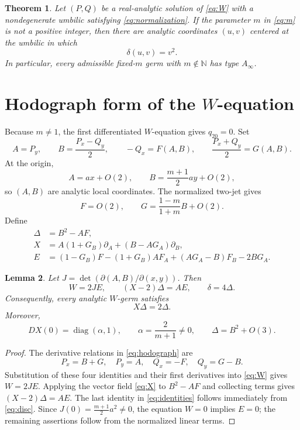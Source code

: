 \documentclass[11pt]{article}
\newtheorem{theorem}{Theorem}
\newtheorem{lemma}[theorem]{Lemma}
\theoremstyle{remark}
\begin{document}
\begin{theorem}\label{thm:main}
Let $(P,Q)$ be a real-analytic solution of \eqref{eq:W} with a
nondegenerate umbilic satisfying \eqref{eq:normalization}.  If the parameter
$m$ in \eqref{eq:m} is not a positive integer, then there are analytic
coordinates $(u,v)$ centered at the umbilic in which
\[
 \delta(u,v)=v^2.
\]
In particular, every admissible fixed-$m$ germ with $m\notin\mathbb N$ has type
$A_\infty$.
\end{theorem}

\section{Hodograph form of the \texorpdfstring{$W$}{W}-equation}

Because $m\ne1$, the first differentiated $W$-equation gives $q_{20}=0$.
Set
\begin{equation}\label{eq:hodograph}
 A=P_y,
 \qquad
 B=\frac{P_x-Q_y}{2},
 \qquad
 -Q_x=F(A,B),
 \qquad
 \frac{P_x+Q_y}{2}=G(A,B).
\end{equation}
At the origin,
\[
 A=ax+O(2),
 \qquad
 B=\frac{m+1}{2}ay+O(2),
\]
so $(A,B)$ are analytic local coordinates.  The normalized two-jet gives
\[
 F=O(2),
 \qquad
 G=\frac{1-m}{1+m}B+O(2).
\]
Define
\begin{align}
 \Delta&=B^2-AF,\label{eq:Delta}\\
 X&=A(1+G_B)\partial_A+(B-AG_A)\partial_B,\label{eq:X}\\
 E&=(1-G_B)F-(1+G_B)AF_A
 +(AG_A-B)F_B-2BG_A.\label{eq:E}
\end{align}

\begin{lemma}\label{lem:identities}
Let $J=\det(\partial(A,B)/\partial(x,y))$.  Then
\begin{equation}\label{eq:identities}
 W=2JE,
 \qquad
 (X-2)\Delta=AE,
 \qquad
 \delta=4\Delta.
\end{equation}
Consequently, every analytic $W$-germ satisfies
\begin{equation}\label{eq:eigenfunction}
 X\Delta=2\Delta.
\end{equation}
Moreover,
\begin{equation}\label{eq:linear}
 DX(0)=\operatorname{diag}(\alpha,1),
 \qquad
 \alpha=\frac{2}{m+1}\ne0,
 \qquad
 \Delta=B^2+O(3).
\end{equation}
\end{lemma}

\begin{proof}
The derivative relations in \eqref{eq:hodograph} are
\[
 P_x=B+G,
 \quad P_y=A,
 \quad Q_x=-F,
 \quad Q_y=G-B.
\]
Substitution of these four identities and their first derivatives into
\eqref{eq:W} gives $W=2JE$.  Applying the vector field \eqref{eq:X} to
$B^2-AF$ and collecting terms gives $(X-2)\Delta=AE$.  The last identity
in \eqref{eq:identities} follows immediately from \eqref{eq:disc}.
Since $J(0)=\frac{m+1}{2}a^2\ne0$, the equation $W=0$ implies $E=0$;
the remaining assertions follow from the normalized linear terms.
\end{proof}
\end{document}
